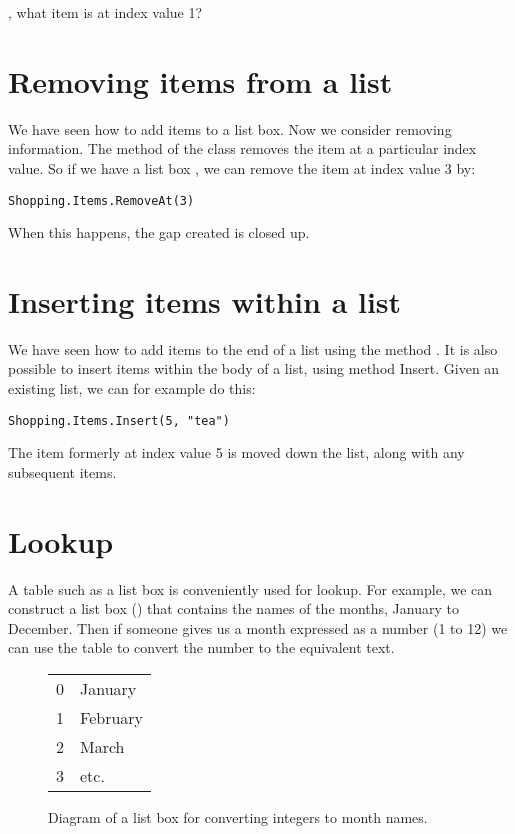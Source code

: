 		\begin{stqb}
			\begin{STQ}
				\item {}, what item is at index value 1?
			\end{STQ}
		\end{stqb}


	\section{Removing items from a list}
	We have seen how to add items to a list box. Now we consider removing information. The method  of the class  removes the item at a particular index value. So if we have a list box , we can remove the item at index value 3 by:
		\begin{lstlisting}
Shopping.Items.RemoveAt(3)
		\end{lstlisting}
		When this happens, the gap created is closed up.


	\section{Inserting items within a list}
	We have seen how to add items to the end of a list using the method . It is also possible to insert items within the body of a list, using method Insert. Given an existing list, we can for example do this:
		\begin{lstlisting}
Shopping.Items.Insert(5, "tea")
		\end{lstlisting}
		The item formerly at index value 5 is moved down the list, along with any subsequent items.
	

	\section{Lookup}
		A table such as a list box is conveniently used for lookup. For example, we can construct a list box () that contains the names of the months, January to December. Then if someone gives us a month expressed as a number (1 to 12) we can use the table to convert the number to the equivalent text.
		\begin{figure}[bth]
			\centering
			\begin{tabular}{l|l|}
				\cline{2-2}
				0 & January\\ \cline{2-2}
				1 & February\\ \cline{2-2}
				2 & March\\ \cline{2-2}
				3 & etc.\\ \cline{2-2}
			\end{tabular}
			\caption{Diagram of a list box for converting integers to month names.}
			\label{fig:data_diagram_lookup}
		\end{figure}
		
